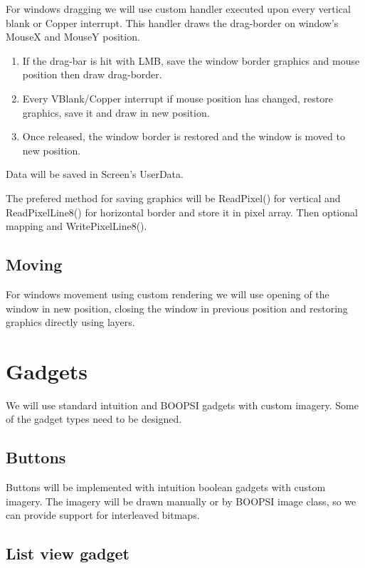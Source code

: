 \documentclass[12pt]{article}
\begin{document}
For windows dragging we will use custom handler executed upon every vertical blank or Copper interrupt. This handler
draws the drag-border on window's MouseX and MouseY position.

\begin{enumerate}
\item If the drag-bar is hit with LMB, save the window border graphics and mouse position then draw drag-border.
\item Every VBlank/Copper interrupt if mouse position has changed, restore graphics, save it and draw in new
 position.
\item Once released, the window border is restored and the window is moved to new position.
\end{enumerate}

Data will be saved in Screen's UserData.

The prefered method for saving graphics will be ReadPixel() for vertical and ReadPixelLine8() for horizontal 
border and store it in pixel array. Then optional mapping and WritePixelLine8().

\subsection{Moving}

For windows movement using custom rendering we will use opening of the window in new position, closing the window 
in previous position and restoring graphics directly using layers.

\section{Gadgets}

We will use standard intuition and BOOPSI gadgets with custom imagery. Some of the gadget types need to be designed.

\subsection{Buttons}

Buttons will be implemented with intuition boolean gadgets with custom imagery. The imagery will be drawn manually or by BOOPSI image class, so we can provide support for interleaved bitmaps.

\subsection{List view gadget}
\end{document}
